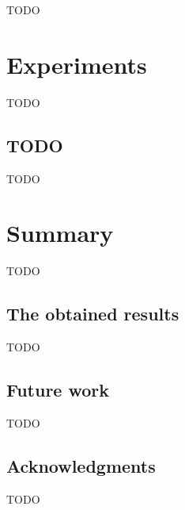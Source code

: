\documentclass[longabstract, english, mgr]{iithesis}
\newcommand\numberedchapter[1]{\setlength\topskip{3cm}\chapter{#1}\setlength\topskip{0cm}}
\theoremstyle{default_theorem_style}\newtheorem{theorem}{Theorem}
\theoremstyle{default_theorem_style}\newtheorem{definition}{Definition}
\begin{document}
TODO

\numberedchapter{Experiments}

TODO

\section{TODO}

TODO

\numberedchapter{Summary}

TODO

\section{The obtained results}

TODO

\section{Future work}

TODO

\section{Acknowledgments}

TODO
\end{document}
